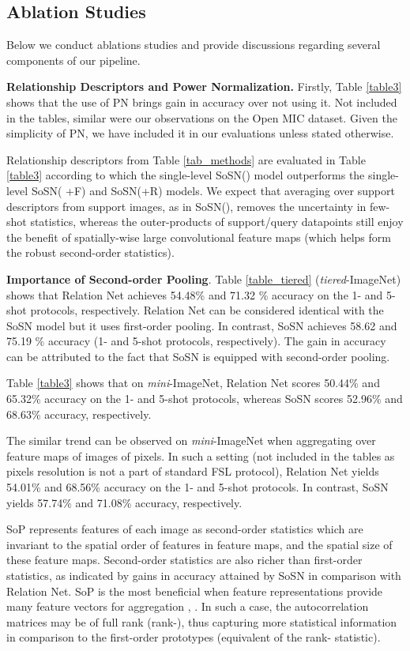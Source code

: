 \subsection{Ablation Studies}
\label{sec:abl}
Below we conduct ablations studies and provide discussions regarding several components of our pipeline.

\vspace{0.05cm}
\noindent\textbf{Relationship Descriptors and Power Normalization.}  Firstly, Table \ref{table3} shows that the use of PN brings  gain in accuracy over not using it. Not included in the tables, similar were our observations on the Open MIC dataset. Given the simplicity of PN, we have included it in our evaluations unless stated otherwise. 

Relationship descriptors from Table \ref{tab_methods} are evaluated in Table \ref{table3} according to which the single-level SoSN() model outperforms the single-level SoSN( +F) and SoSN(+R) models. We expect that averaging over  support descriptors from  support images, as in SoSN(),  removes the uncertainty in few-shot statistics, whereas the outer-products of support/query datapoints still enjoy the benefit of spatially-wise large convolutional feature maps (which helps form the robust second-order statistics). 

\vspace{0.05cm}
{ \noindent\textbf{Importance of Second-order Pooling}. Table \ref{table_tiered} ({\em tiered}-ImageNet) shows that Relation Net achieves  54.48\% and 71.32 \% accuracy on the 1- and 5-shot protocols, respectively. Relation Net can be considered identical with the SoSN model but it uses first-order pooling. In contrast, SoSN achieves 58.62 and 75.19 \% accuracy (1- and 5-shot protocols, respectively). The gain in accuracy can be attributed to the fact that SoSN is equipped with second-order pooling. 

Table \ref{table3} shows that on {\em mini}-ImageNet, Relation Net scores 50.44\% and 65.32\% accuracy on the 1- and 5-shot protocols, whereas SoSN scores  52.96\% and 68.63\% accuracy, respectively.

The similar trend can be observed on {\em mini}-ImageNet when aggregating over feature maps of images of  pixels. In such a  setting (not included in the tables as  pixels resolution is not a part of standard FSL protocol), Relation Net yields 54.01\% and 68.56\%  accuracy on the 1- and 5-shot protocols. In contrast, SoSN yields 57.74\% and 71.08\% accuracy, respectively.

SoP represents features of each image as second-order statistics which are invariant to the spatial order of features in feature maps, and the spatial size of these feature maps. Second-order statistics are also richer than first-order statistics, as indicated by gains in accuracy attained by SoSN in comparison with Relation Net. SoP is the most beneficial when feature representations provide many feature vectors for aggregation \eg, . In such a case, the autocorrelation matrices may be of full rank (rank-), thus capturing more statistical information in comparison to the first-order prototypes (equivalent of the rank- statistic).
}

